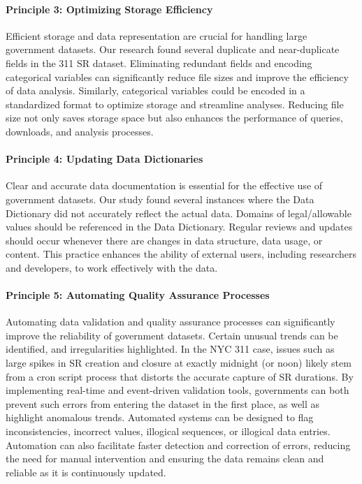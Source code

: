 \documentclass[linenumber]{jdsart}
\begin{document}
\paragraph{Principle 3: Optimizing Storage Efficiency}
Efficient storage and data representation are crucial for handling 
large government datasets. Our research found several duplicate and
near-duplicate fields in the 311 SR dataset. Eliminating 
redundant fields and encoding categorical variables can 
significantly reduce file sizes and improve the efficiency 
of data analysis. Similarly, categorical variables could be 
encoded in a standardized format to optimize storage and 
streamline analyses. Reducing file size not only saves 
storage space but also enhances the performance of queries, 
downloads,  and analysis processes.


\paragraph{Principle 4: Updating Data Dictionaries}
Clear and accurate data documentation is essential for the effective use 
of government datasets. Our study found several 
instances where the Data Dictionary did not accurately reflect the 
actual data. Domains of legal/allowable values should be referenced
in the Data Dictionary. Regular reviews and updates should 
occur whenever there are changes in data structure, data usage, or 
content. This practice enhances the ability of external users, 
including researchers and developers, to work 
effectively with the data.

\paragraph{Principle 5: Automating Quality Assurance Processes}
Automating data validation and quality assurance processes can 
significantly improve the reliability of government datasets. Certain
unusual trends can be identified, and irregularities highlighted. 
In the NYC 311 case, issues such as large spikes in SR 
creation and closure at exactly midnight (or noon) likely 
stem from a cron script process that distorts the 
accurate capture of SR durations. By implementing 
real-time and event-driven validation tools, governments 
can both prevent such errors from entering the dataset in the first 
place, as well as highlight anomalous trends. Automated 
systems can be designed to flag inconsistencies, incorrect values, 
illogical sequences, or illogical data entries. Automation can 
also facilitate faster detection and correction of errors, reducing 
the need for manual intervention and ensuring the data 
remains clean and reliable as it is continuously updated.
\end{document}
